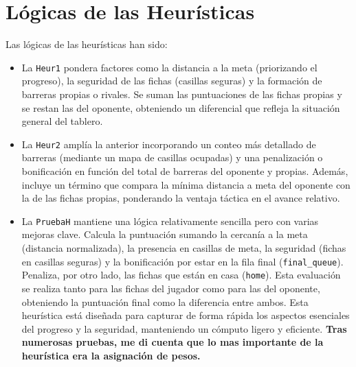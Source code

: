 \section*{Lógicas de las Heurísticas}
Las lógicas de las heurísticas han sido:

\begin{itemize}
    \item La \texttt{Heur1} pondera factores como la distancia a la meta (priorizando el progreso), la seguridad de las fichas (casillas seguras) y la formación de barreras propias o rivales. Se suman las puntuaciones de las fichas propias y se restan las del oponente, obteniendo un diferencial que refleja la situación general del tablero.
    
    \item La \texttt{Heur2} amplía la anterior incorporando un conteo más detallado de barreras (mediante un mapa de casillas ocupadas) y una penalización o bonificación en función del total de barreras del oponente y propias. Además, incluye un término que compara la mínima distancia a meta del oponente con la de las fichas propias, ponderando la ventaja táctica en el avance relativo.
    

    \item La \texttt{PruebaH} mantiene una lógica relativamente sencilla pero con varias mejoras clave. Calcula la puntuación sumando la cercanía a la meta (distancia normalizada), la presencia en casillas de meta, la seguridad (fichas en casillas seguras) y la bonificación por estar en la fila final (\texttt{final\_queue}). Penaliza, por otro lado, las fichas que están en casa (\texttt{home}). Esta evaluación se realiza tanto para las fichas del jugador como para las del oponente, obteniendo la puntuación final como la diferencia entre ambos. Esta heurística está diseñada para capturar de forma rápida los aspectos esenciales del progreso y la seguridad, manteniendo un cómputo ligero y eficiente. \textbf{Tras numerosas pruebas, me di cuenta que lo mas importante de la heurística era la asignación de pesos.}
    

\end{itemize}

